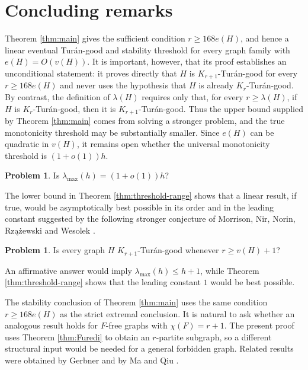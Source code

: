 \documentclass[11pt]{article}
\numberwithin{equation}{section}
\theoremstyle{definition}
\newtheorem{problem}[theorem]{Problem}
\theoremstyle{remark}
\begin{document}
\section{Concluding remarks}

Theorem \ref{thm:main} gives the sufficient condition $r\ge168e(H)$, and hence a linear eventual Tur\'an-good and stability threshold for every graph family with $e(H)=O(v(H))$. It is important, however, that its proof establishes an unconditional statement: it proves directly that $H$ is $K_{r+1}$-Tur\'an-good for every $r\ge168e(H)$ and never uses the hypothesis that $H$ is already $K_r$-Tur\'an-good. 
By contrast, the definition of $\lambda(H)$ requires only that, for every $r\ge \lambda(H)$, if $H$ is $K_r$-Tur\'an-good, then it is $K_{r+1}$-Tur\'an-good.
Thus the upper bound supplied by Theorem \ref{thm:main} comes from solving a stronger problem, and the true monotonicity threshold may be substantially smaller. Since $e(H)$ can be quadratic in $v(H)$, it remains open whether the universal monotonicity threshold is $(1+o(1))h$.

\begin{problem}
\label{prob:linear-lambda}
Is $\lambda_{\max}(h)=(1+o(1))h$?
\end{problem}

The lower bound in Theorem \ref{thm:threshold-range} shows that a linear result, if true, would be asymptotically best possible in its order and in the leading constant suggested by the following stronger conjecture of Morrison, Nir, Norin, Rz\k{a}\.zewski and Wesolek \cite{MorrisonEtAl}.

\begin{problem}
\label{prob:vplusone}
Is every graph $H$ $K_{r+1}$-Tur\'an-good whenever $r\ge v(H)+1$?
\end{problem}

An affirmative answer would imply $\lambda_{\max}(h)\le h+1$, while Theorem \ref{thm:threshold-range} shows that the leading constant $1$ would be best possible.

The stability conclusion of Theorem \ref{thm:main} uses the same condition $r\ge 168e(H)$ as the strict extremal conclusion. It is natural to ask whether an analogous result holds for $F$-free graphs with $\chi(F)=r+1$. The present proof uses Theorem \ref{thm:Furedi} to obtain an $r$-partite subgraph, so a different structural input would be needed for a general forbidden graph. Related results were obtained by Gerbner \cite{GerbnerStability,GerbnerWeak} and by Ma and Qiu \cite{MaQiu}.
\end{document}
